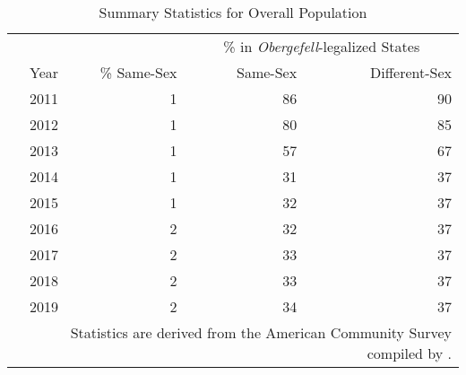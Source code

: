 \begin{table}[htbp]

\caption{Summary Statistics for Overall Population}
\label{tab:overall_table}
\centering
\begin{tabular}[t]{rrrr}
\toprule
\multicolumn{2}{c}{ } & \multicolumn{2}{c}{\% in \textit{Obergefell}-legalized States} \\
\cmidrule(l{3pt}r{3pt}){3-4}
Year & \% Same-Sex & Same-Sex & Different-Sex\\
\midrule
2011 & 1 & 86 & 90\\
2012 & 1 & 80 & 85\\
2013 & 1 & 57 & 67\\
2014 & 1 & 31 & 37\\
2015 & 1 & 32 & 37\\
2016 & 2 & 32 & 37\\
2017 & 2 & 33 & 37\\
2018 & 2 & 33 & 37\\
2019 & 2 & 34 & 37\\
\bottomrule
\multicolumn{4}{p{0.6\linewidth}}{\footnotesize Statistics are derived from the American Community Survey compiled by \citet{28}.} \\
\end{tabular}
\end{table}
